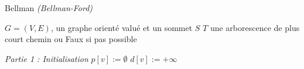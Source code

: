 \documentclass{article}      %
\begin{document}
\begin{algorithm} \caption{Bellman \textit{(Bellman-Ford)}}
\begin{algorithmic}
\Require $G = (V, E)$, un graphe orienté valué et un sommet $S$
\Ensure $T$ une arborescence de plus court chemin ou Faux si pas possible

\State \textit{Partie 1 : Initialisation}
    \State $p[v] := \emptyset$
    \State $d[v] := +\infty$
\EndFor
\end{algorithmic}
\end{algorithm}
\end{document}
